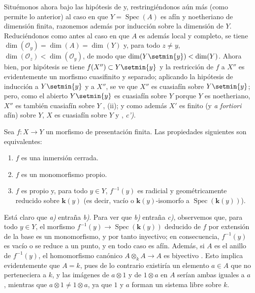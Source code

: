 Situémonos ahora bajo las hipótesis de  y, restringiéndonos aún más (como permite lo anterior) al caso en que $Y=\operatorname{Spec}(A)$ es afín y noetheriano de dimensión finita, razonemos además por inducción sobre la dimensión de $Y$.
Reduciéndonos como antes al caso en que $A$ es además local y completo, se tiene $\dim(\mathcal O_y)=\dim(A)=\dim(Y)$ y, para todo $z\neq y$, $\dim(\mathcal O_z)<\dim(\mathcal O_y)$, de modo que $\dim(Y\setmin\{y\})<\dim(Y)$.
Ahora bien, por hipótesis se tiene $f(X'')\subset Y\setmin\{y\}$ y la restricción de $f$ a $X''$ es evidentemente un morfismo cuasifinito y separado; aplicando la hipótesis de inducción a $Y\setmin\{y\}$ y a $X''$, se ve que $X''$ es cuasiafín sobre $Y\setmin\{y\}$; pero, como el abierto $Y\setmin\{y\}$ es cuasiafín sobre $Y$ porque $Y$ es noetheriano, $X''$ es también cuasiafín sobre $Y$ , (ii); y como además $X'$ es finito (y \emph{a fortiori} afín) sobre $Y$, $X$ es cuasiafín sobre $Y$  y , \emph{c')}.

\begin{proposition}[8.11.5]
\label{IV.8.11.5-fr}
Sea $f:X\to Y$ un morfismo de presentación finita.
Las propiedades siguientes son equivalentes:
\begin{enumerate}[label=\emph{\alph*)}]
  \item $f$ es una inmersión cerrada.
  \item $f$ es un monomorfismo propio.
  \item $f$ es propio y, para todo $y\in Y$, $f^{-1}(y)$ es radicial y geométricamente reducido sobre $\boldsymbol{k}(y)$ (es decir, vacío o $\boldsymbol{k}(y)$-isomorfo a $\operatorname{Spec}(\boldsymbol{k}(y))$).
\end{enumerate}
\end{proposition}

Está claro que \emph{a)} entraña \emph{b)}.
Para ver que \emph{b)} entraña \emph{c)}, observemos  que, para todo $y\in Y$, el morfismo $f^{-1}(y)\to\operatorname{Spec}(\boldsymbol{k}(y))$ deducido de $f$ por extensión de la base es un monomorfismo, y por tanto inyectivo; en consecuencia, $f^{-1}(y)$ es vacío o se reduce a un punto, y en todo caso es afín.
Además, si $A$ es el anillo de $f^{-1}(y)$, el homomorfismo canónico $A\otimes_kA\to A$ es biyectivo .
Esto implica evidentemente que $A=k$, pues de lo contrario existiría un elemento $a\in A$ que no perteneciera a $k$, y las imágenes de $a\otimes1$ y de $1\otimes a$ en $A$ serían ambas iguales a $a$, mientras que $a\otimes1\neq1\otimes a$, ya que $1$ y $a$ forman un sistema libre sobre $k$.

